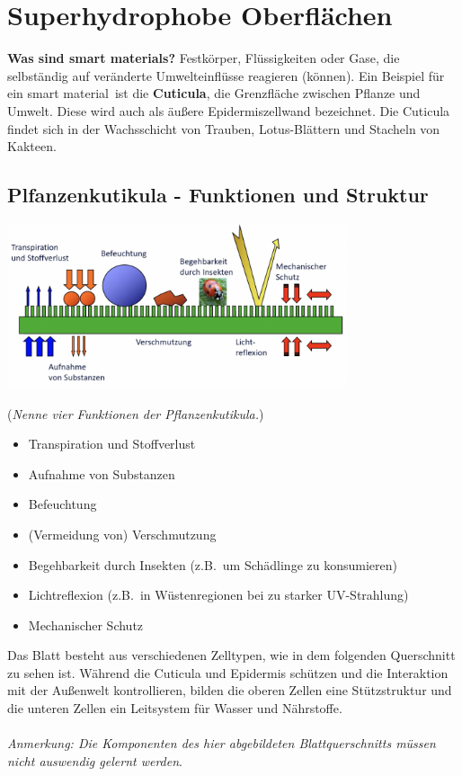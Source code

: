 \section{Superhydrophobe Oberflächen}

\textbf{Was sind \glqq smart materials\grqq \dangersign?} Festkörper, Flüssigkeiten oder Gase, die selbständig auf veränderte Umwelteinflüsse reagieren (können). Ein Beispiel für ein \glqq smart material\grqq\ ist die \textbf{Cuticula}, die Grenzfläche zwischen Pflanze und Umwelt. Diese wird auch als äußere Epidermiszellwand bezeichnet. Die Cuticula findet sich in der Wachsschicht von Trauben, Lotus-Blättern und Stacheln von Kakteen. 

\subsection{Plfanzenkutikula - Funktionen und Struktur}

\begin{center}
	\includegraphics[width=10cm]{lec2/figures/kutikula-funktionen.png}
\end{center}
(\dangersign \textit{Nenne vier Funktionen der Pflanzenkutikula.})

\begin{itemize}
    \item Transpiration und Stoffverlust
    \item Aufnahme von Substanzen
    \item Befeuchtung
    \item (Vermeidung von) Verschmutzung
    \item Begehbarkeit durch Insekten (z.B.\ um Schädlinge zu konsumieren)
    \item Lichtreflexion (z.B.\ in Wüstenregionen bei zu starker UV-Strahlung)
    \item Mechanischer Schutz
\end{itemize}
Das Blatt besteht aus verschiedenen Zelltypen, wie in dem folgenden Querschnitt zu sehen ist. Während die Cuticula und Epidermis schützen und die Interaktion mit der Außenwelt kontrollieren, bilden die oberen Zellen eine Stützstruktur und die unteren Zellen ein Leitsystem für Wasser und Nährstoffe.
\\\\
\textit{Anmerkung: Die Komponenten des hier abgebildeten Blattquerschnitts müssen nicht auswendig gelernt werden}.

